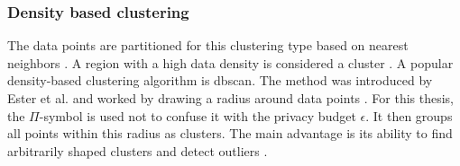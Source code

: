 
\subsubsection{Density based clustering}
The data points are partitioned for this clustering type based on nearest neighbors \citep{fahad_survey_2014}.
A region with a high data density is considered a cluster \citep{xu_comprehensive_2015}.
A popular density-based clustering algorithm is \gls{dbscan}.
The method was introduced by Ester et al. and worked by drawing a radius around data points \citep{ester_density-based_nodate}.
For this thesis, the $\Pi$-symbol is used not to confuse it with the privacy budget $\epsilon$.
It then groups all points within this radius as clusters.
The main advantage is its ability to find arbitrarily shaped clusters and detect outliers \citep{liu_privacy_2012}.

